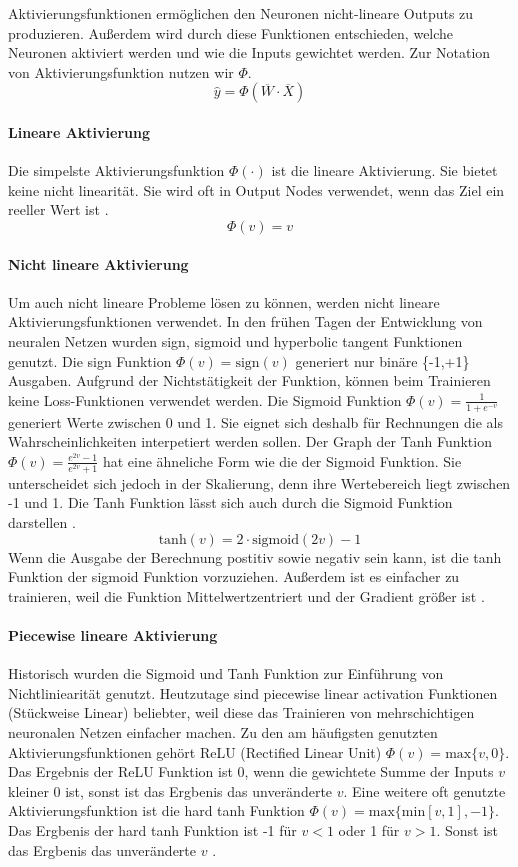 Aktivierungsfunktionen ermöglichen den Neuronen nicht-lineare Outputs zu produzieren. Außerdem wird durch diese Funktionen entschieden, 
welche Neuronen aktiviert werden und wie die Inputs gewichtet werden. Zur Notation von Aktivierungsfunktion nutzen wir $\Phi$.
$$\hat{y} = \Phi(\overline{W} \cdot \overline{X})$$
\paragraph{Lineare Aktivierung}
Die simpelste Aktivierungsfunktion $\Phi(\cdot)$ ist die lineare Aktivierung. Sie bietet keine nicht linearität. Sie wird oft in Output Nodes
verwendet, wenn das Ziel ein reeller Wert ist \cite{CA18}.
$$\Phi(v) = v$$
\paragraph{Nicht lineare Aktivierung}
Um auch nicht lineare Probleme lösen zu können, werden nicht lineare Aktivierungsfunktionen verwendet. In den frühen Tagen der Entwicklung von neuralen Netzen wurden sign, sigmoid und hyperbolic tangent Funktionen genutzt.
Die sign Funktion $\Phi(v) = \text{sign}(v)$ generiert nur binäre \{-1,+1\} Ausgaben. Aufgrund der Nichtstätigkeit der Funktion, können beim Trainieren keine Loss-Funktionen verwendet werden.
Die Sigmoid Funktion $\Phi(v) = \frac{1}{1 + e^{-v}}$ generiert Werte zwischen 0 und 1. Sie eignet sich deshalb für Rechnungen die als Wahrscheinlichkeiten interpetiert werden sollen.
Der Graph der Tanh Funktion $\Phi(v) = \frac{e^{2v} - 1}{e^{2v} + 1}$ hat eine ähneliche Form wie die der Sigmoid Funktion. Sie unterscheidet sich jedoch in der Skalierung, denn ihre Wertebereich liegt zwischen -1 und 1.
Die Tanh Funktion lässt sich auch durch die Sigmoid Funktion darstellen \cite{CA18}.
$$\text{tanh}(v) = 2 \cdot \text{sigmoid}(2v) - 1$$
Wenn die Ausgabe der Berechnung postitiv sowie negativ sein kann, ist die tanh Funktion der sigmoid Funktion vorzuziehen. Außerdem ist es einfacher zu trainieren, weil die Funktion Mittelwertzentriert
und der Gradient größer ist \cite{CA18}.

\paragraph{Piecewise lineare Aktivierung}
Historisch wurden die Sigmoid und Tanh Funktion zur Einführung von Nichtliniearität genutzt. Heutzutage sind piecewise linear activation Funktionen (Stückweise Linear) beliebter, weil diese das Trainieren 
von mehrschichtigen neuronalen Netzen einfacher machen.
Zu den am häufigsten genutzten Aktivierungsfunktionen gehört ReLU (Rectified Linear Unit) $\Phi(v) = \text{max}\{v,0\}$. Das Ergebnis der ReLU Funktion ist 0, wenn die gewichtete Summe der Inputs $v$ kleiner 0 ist, sonst ist das Ergbenis das unveränderte $v$.
Eine weitere oft genutzte Aktivierungsfunktion ist die hard tanh Funktion $\Phi(v) = \text{max}\{\text{min}[v,1],-1\}$. Das Ergbenis der hard tanh Funktion ist -1 für $v < 1$ oder 1 für $v > 1$. Sonst ist das Ergbenis das unveränderte $v$ \cite{CA18}. 

